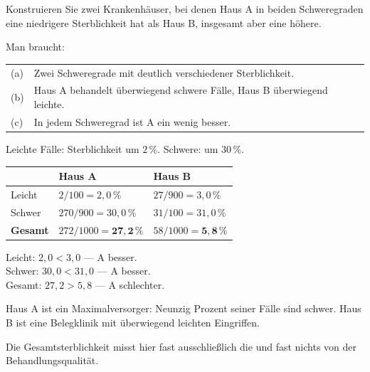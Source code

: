 \begin{aufgabe}
Konstruieren Sie zwei Krankenhäuser, bei denen Haus A in beiden Schweregraden eine niedrigere Sterblichkeit hat als Haus B, insgesamt aber eine höhere.

\loesung
{}
Man braucht:
\begin{center}
\renewcommand{\arraystretch}{1.5}
\begin{tabular}{@{}P{1.0cm}P{7.4cm}@{}}
\toprule
(a) & Zwei Schweregrade mit deutlich verschiedener Sterblichkeit.\\
(b) & Haus A behandelt überwiegend schwere Fälle, Haus B überwiegend leichte.\\
(c) & In jedem Schweregrad ist A ein wenig besser.\\
\bottomrule
\end{tabular}
\end{center}

Leichte Fälle: Sterblichkeit um $2\,\%$. Schwere: um $30\,\%$.

\begin{center}
{\small
\renewcommand{\arraystretch}{1.45}
\begin{tabular}{@{}P{2.2cm}P{2.8cm}P{2.8cm}@{}}
\toprule
& \textbf{Haus A} & \textbf{Haus B}\\
\midrule
Leicht & $2/100 = 2{,}0\,\%$ & $27/900 = 3{,}0\,\%$\\
Schwer & $270/900 = 30{,}0\,\%$ & $31/100 = 31{,}0\,\%$\\
\midrule
\textbf{Gesamt} & $272/1000 = \mathbf{27{,}2\,\%}$ & $58/1000 = \mathbf{5{,}8\,\%}$\\
\bottomrule
\end{tabular}}
\end{center}

Leicht: $2{,}0 < 3{,}0$ --- A besser. \checkmark\\
Schwer: $30{,}0 < 31{,}0$ --- A besser. \checkmark\\
Gesamt: $27{,}2 > 5{,}8$ --- A  schlechter. \checkmark

Haus A ist ein Maximalversorger: Neunzig Prozent seiner Fälle sind schwer. Haus B ist eine Belegklinik mit überwiegend leichten Eingriffen.

Die Gesamtsterblichkeit misst hier fast ausschließlich die  und fast nichts von der Behandlungsqualität.


\end{aufgabe}
